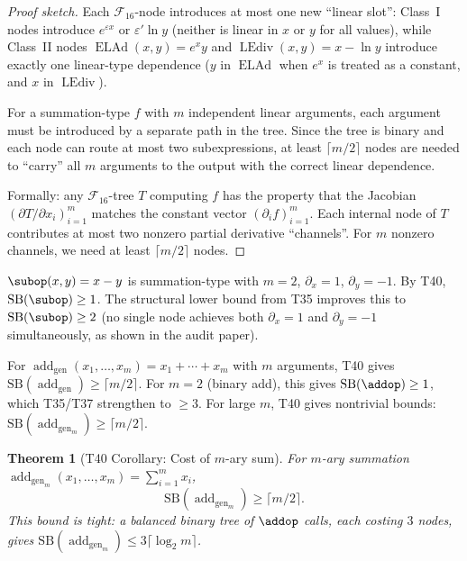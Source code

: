 \documentclass[12pt,a4paper]{article}
\newtheorem{theorem}{Theorem}[section]
\theoremstyle{definition}
\newcommand{\ELAd}{\operatorname{ELAd}}
\newcommand{\LEdiv}{\operatorname{LEdiv}}
\newcommand{\F}{\mathcal{F}_{16}}
\newcommand{\SB}{\mathrm{SB}}
\newcommand{\addgen}{\operatorname{add}_{\mathrm{gen}}}
\begin{document}
\begin{proof}[Proof sketch]
Each $\F$-node introduces at most one new ``linear slot'': Class~I nodes
introduce $e^{\varepsilon x}$ or $\varepsilon'\ln y$ (neither is linear in $x$ or $y$
for all values), while Class~II nodes $\ELAd(x,y) = e^x y$ and $\LEdiv(x,y) = x-\ln y$
introduce exactly one linear-type dependence ($y$ in $\ELAd$ when $e^x$ is treated
as a constant, and $x$ in $\LEdiv$).

For a summation-type $f$ with $m$ independent linear arguments, each argument
must be introduced by a separate path in the tree.  Since the tree is binary
and each node can route at most two subexpressions, at least $\lceil m/2\rceil$
nodes are needed to ``carry'' all $m$ arguments to the output with the correct
linear dependence.

Formally: any $\F$-tree $T$ computing $f$ has the property that the Jacobian
$(\partial T/\partial x_i)_{i=1}^m$ matches the constant vector
$(\partial_i f)_{i=1}^m$.  Each internal node of $T$ contributes at most two
nonzero partial derivative ``channels''.  For $m$ nonzero channels, we need
at least $\lceil m/2 \rceil$ nodes.
\end{proof}

\begin{example}
$\subop(x,y) = x - y$ is summation-type with $m=2$, $\partial_x = 1$,
$\partial_y = -1$.  By T40, $\SB(\subop) \ge 1$.  The structural lower bound
from T35 improves this to $\SB(\subop) \ge 2$ (no single node achieves both
$\partial_x=1$ and $\partial_y=-1$ simultaneously, as shown in the audit paper).
\end{example}

\begin{example}
For $\addgen(x_1,\ldots,x_m) = x_1 + \cdots + x_m$ with $m$ arguments,
T40 gives $\SB(\addgen) \ge \lceil m/2\rceil$.  For $m=2$ (binary add),
this gives $\SB(\addop) \ge 1$, which T35/T37 strengthen to $\ge 3$.
For large $m$, T40 gives nontrivial bounds: $\SB(\addgen_m) \ge \lceil m/2\rceil$.
\end{example}

\begin{theorem}[T40 Corollary: Cost of $m$-ary sum]
\label{cor:T40msum}
For $m$-ary summation $\addgen_m(x_1,\ldots,x_m) = \sum_{i=1}^m x_i$,
\[
  \SB(\addgen_m) \ge \lceil m/2 \rceil.
\]
This bound is tight: a balanced binary tree of $\addop$ calls, each costing
$3$ nodes, gives $\SB(\addgen_m) \le 3\lceil \log_2 m \rceil$.
\end{theorem}
\end{document}
